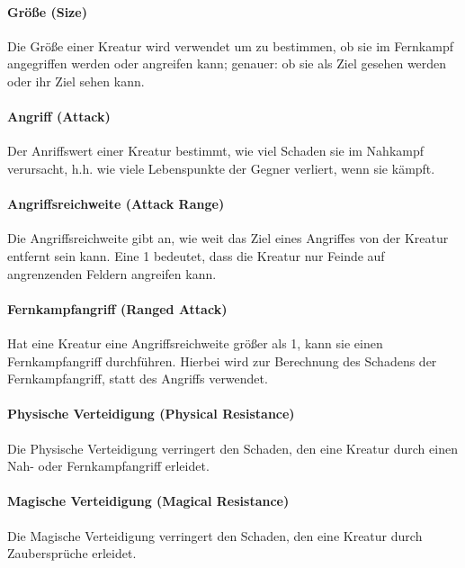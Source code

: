 \documentclass[a4paper,12pt]{scrartcl}
\begin{document}
	\paragraph{Größe (\glqq Size\grqq\hspace{0.05em})}
	Die Größe einer Kreatur wird verwendet um zu bestimmen, ob sie im Fernkampf angegriffen werden oder angreifen kann; genauer: ob sie als Ziel gesehen werden oder ihr Ziel sehen kann.
	
	\paragraph{Angriff (\glqq Attack\grqq\hspace{0.05em})}
	Der Anriffswert einer Kreatur bestimmt, wie viel Schaden sie im Nahkampf verursacht, h.h. wie viele Lebenspunkte der Gegner verliert, wenn sie kämpft.
	
	\paragraph{Angriffsreichweite (\glqq Attack Range\grqq\hspace{0.05em})}
	Die Angriffsreichweite gibt an, wie weit das Ziel eines Angriffes von der Kreatur entfernt sein kann. Eine 1 bedeutet, dass die Kreatur nur Feinde auf angrenzenden Feldern angreifen kann.
	
	\paragraph{Fernkampfangriff (\glqq Ranged Attack\grqq\hspace{0.05em})}
	Hat eine Kreatur eine Angriffsreichweite größer als 1, kann sie einen Fernkampfangriff durchführen. Hierbei wird zur Berechnung des Schadens der Fernkampfangriff, statt des Angriffs verwendet.
	
	\paragraph{Physische Verteidigung (\glqq Physical Resistance\grqq\hspace{0.05em})}
	Die Physische Verteidigung verringert den Schaden, den eine Kreatur durch einen Nah- oder Fernkampfangriff erleidet.
	
	\paragraph{Magische Verteidigung (\glqq Magical Resistance\grqq\hspace{0.05em})}
	Die Magische Verteidigung verringert den Schaden, den eine Kreatur durch Zaubersprüche erleidet.
	
\end{document}
